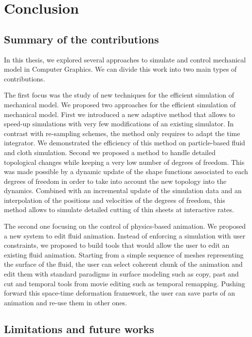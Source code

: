 \chapter{Conclusion}
\label{chap:conclusion}

\section{Summary of the contributions}
In this thesis, we explored several approaches to simulate and control mechanical model in Computer Graphics. We can divide this work into two main types of contributions.

The first focus was the study of new techniques for the efficient simulation of mechanical model. We proposed two approaches for the efficient simulation of mechanical model. First we introduced a new adaptive method that allows to speed-up simulations with very few modifications of an existing simulator. In contrast with re-sampling schemes, the method only requires to adapt the time integrator. We demonstrated the efficiency of this method on particle-based fluid and cloth simulation. Second we proposed a method to handle detailed topological changes while keeping a very low number of degrees of freedom. This was made possible by a dynamic update of the shape functions associated to each degrees of freedom in order to take into account the new topology into the dynamics. Combined with an incremental update of the simulation data and an interpolation of the positions and velocities of the degrees of freedom, this method allows to simulate detailed cutting of thin sheets at interactive rates.

The second one focusing on the control of physics-based animation. We proposed a new system to edit fluid animation. Instead of enforcing a simulation with user constraints, we proposed to build tools that would allow the user to edit an existing fluid animation. Starting from a simple sequence of meshes representing the surface of the fluid, the user can select coherent chunk of the animation and edit them with standard paradigms in surface modeling such as copy, past and cut and temporal tools from movie editing such as temporal remapping. Pushing forward this space-time deformation framework, the user can save parts of an animation and re-use them in other ones.

\section{Limitations and future works}

